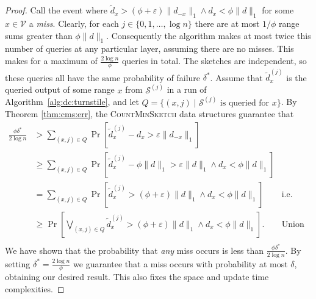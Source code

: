 \documentclass{report}
\newcommand{\algoname}[1]{\textnormal{\textsc{#1}}}
\begin{document}
\begin{proof}
Call the event where $\widetilde{d}_x > (\phi + \varepsilon) \|d_{-x}\|_1 \wedge d_x < \phi \|d\|_1$ for some $x \in \mathcal{V}$ a \emph{miss}.
Clearly, for each $j \in \{0, 1, \dots, \log n\}$ there are at most $1/\phi$ range sums greater than $\phi \|d\|_1$. 
Consequently the algorithm makes at most twice this number of queries at any particular layer, assuming there are no misses. 
This makes for a maximum of $\frac {2 \log n}{\phi}$ queries in total. 
The sketches are independent, so these queries all have the same probability of failure $\delta^*$.
Assume that $\widetilde{d}_x^{(j)}$ is the queried output of some range $x$ from $\mathcal{S}^{(j)}$ in a run of Algorithm~\ref{alg:dc:turnstile}, and 
let $Q = \{(x, j) \mid \mathcal{S}^{(j)} \text{ is queried for $x$}\}$.
By Theorem \ref{thm:cms:err}, the \algoname{CountMinSketch} data structures guarantee that
%
\begin{align*}
\frac{\phi \delta^*}{2\log n}
&>
\sum_{(x, j) \in Q} \Pr \left [ \widetilde{d}_x^{(j)} - d_x > \varepsilon \|d_{-x}\|_1 \right ] 
& \\
&\geq
\sum_{(x, j) \in Q} \Pr \left [ \widetilde{d}_x^{(j)} - \phi\|d\|_1 > \varepsilon \|d\|_1 \wedge d_x < \phi \|d\|_1 \right ] 
& \\
&=
\sum_{(x, j) \in Q} \Pr \left [ \widetilde{d}_x^{(j)} > (\phi + \varepsilon) \|d\|_1 \wedge d_x < \phi \|d\|_1 \right ] 
& \text{i.e. sum of misses}  \\
&\geq
\Pr \left [ \bigvee_{(x, j) \in Q} \widetilde{d}_x^{(j)} > (\phi + \varepsilon) \|d\|_1 \wedge d_x < \phi \|d\|_1 \right ].
& \text{Union bound} \\
\end{align*}
We have shown that the probability that \emph{any} miss occurs is less than $\frac{\phi\delta^*}{2\log n}$.
By setting $\delta^* = \frac{2\log n}{\phi}$ we guarantee that a miss occurs with probability at most $\delta$, obtaining our desired result.
This also fixes the space and update time complexities.
\end{proof}
\end{document}
